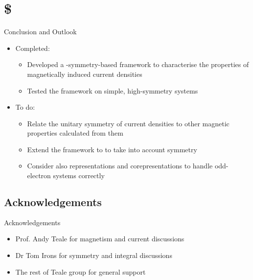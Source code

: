 \section{\$}
\begin{frame}{Conclusion and Outlook}
  \begin{itemize}
    \item Completed:
    \begin{itemize}
      \item Developed a -symmetry-based framework to characterise the  properties of magnetically induced current densities
      \item Tested the framework on simple, high-symmetry systems
    \end{itemize}

    \item To do:
    \begin{itemize}
      \item Relate the unitary symmetry of current densities to other magnetic properties calculated from them
      \item Extend the framework to  to take into account  symmetry
      \item Consider also  representations and corepresentations to handle odd-electron systems correctly
    \end{itemize}
  \end{itemize}
\end{frame}


\subsection{Acknowledgements}
\begin{frame}{Acknowledgements}
  \begin{itemize}
    \item Prof. Andy Teale for magnetism and current discussions
    \item Dr Tom Irons for symmetry and integral discussions
    \item The rest of Teale group for general support
  \end{itemize}
\end{frame}